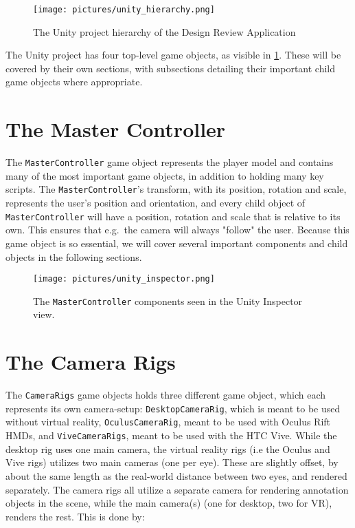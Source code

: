 \begin{figure}%
	\texttt{[image: pictures/unity\_hierarchy.png]}
	\caption[The Unity project hierarchy of the Design Review Application]{The Unity project hierarchy of the Design Review Application}
	\label{fig:unity_hierarchy}
\end{figure} 

The Unity project has four top-level game objects, as visible in \ref{fig:unity_hierarchy}. 
These will be covered by their own sections, with subsections detailing their important child game objects where appropriate.


\section{The Master Controller}
The \texttt{MasterController} game object represents the player model and contains many of the most important game objects, in addition to
holding many key scripts. The \texttt{MasterController}'s transform, with its position, rotation and scale, represents the user's position and orientation, 
and every child object of \texttt{MasterController} will have a position, rotation and scale that is relative to its own. This ensures
that e.g.~the camera will always "follow" the user. Because this game object is so essential, we will cover several important components and
child objects in the following sections.

\begin{figure}%
	\texttt{[image: pictures/unity\_inspector.png]}
	\caption[The \texttt{MasterController} components]{The \texttt{MasterController} components seen in the Unity Inspector view.}
	\label{fig:unity_inspector}
\end{figure} 

\section{The Camera Rigs}
The \texttt{CameraRigs} game objects holds three different game object, which each represents its own camera-setup: \texttt{DesktopCameraRig}, which is meant to be used
without virtual reality, \texttt{OculusCameraRig}, meant to be used with Oculus Rift HMDs, and \texttt{ViveCameraRigs}, meant to be used with the HTC Vive. 
While the desktop rig uses one main camera, the virtual reality rigs (i.e the Oculus and Vive rigs) utilizes two main cameras (one per eye).
These are slightly offset, by about the same length as the real-world distance between two eyes, and rendered separately.
The camera rigs all utilize a separate camera for rendering annotation objects in the scene, while the main camera(s) (one for desktop, two for VR), 
renders the rest. This is done by:

